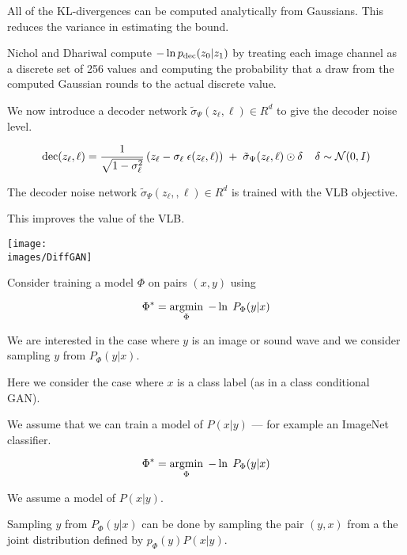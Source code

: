{All of the KL-divergences can be computed analytically from Gaussians.  This reduces the variance in estimating the bound.

\vfill
Nichol and Dhariwal compute $- \ln p_{\mathrm{dec}}(z_0|z_1)$ by treating each image channel as a discrete set of 256 values and computing the probability that a draw from
the computed Gaussian rounds to the actual discrete value.


We now introduce a decoder network $\tilde{\sigma}_\Psi(z_\ell,\ell) \in R^d$ to give the decoder noise level.

\vfill
$$\mathrm{dec}(z_\ell,\ell) = \frac{1}{\sqrt{1-\sigma_\ell^2}}\left(z_\ell - \sigma_\ell\; \epsilon(z_\ell,\ell)\right)\; +\; \tilde{\sigma}_\Psi(z_\ell,\ell)\odot\delta\;\;\;\;\delta \sim {\cal N}(0,I)$$

\vfill
The decoder noise network $\tilde{\sigma}_\Psi(z_\ell,,\ell) \in R^d$ is trained with the VLB objective.

\vfill
This improves the value of the VLB.


\centerline{\texttt{[image: \\images/DiffGAN]}}


Consider training a model $\Phi$ on pairs $(x,y)$ using

$$\Phi^* = \operatorname*{argmin}_\Phi\;-\ln\;P_\Phi(y|x)$$

\vfill
We are interested in the case where $y$ is an image or sound wave and we consider sampling $y$ from $P_\Phi(y|x)$.

\vfill
Here we consider the case where $x$ is a class label (as in a class conditional GAN).

\vfill
We assume that we can train a model of $P(x|y)$  --- for example an ImageNet classifier.


$$\Phi^* = \operatorname*{argmin}_\Phi\;-\ln\;P_\Phi(y|x)$$

\vfill
We assume a model of $P(x|y)$.

\vfill
Sampling $y$ from $P_\Phi(y|x)$ can be done by sampling the pair $(y,x)$ from a the joint distribution defined by $p_\Phi(y)P(x|y)$.


}
